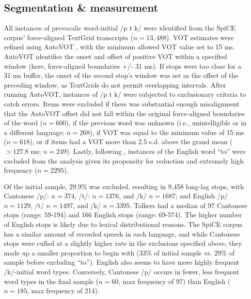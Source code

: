 \subsection{Segmentation \& measurement}
All instances of prevocalic word-initial /p t k/ were identified from the SpiCE corpus' force-aligned TextGrid transcripts ($n=13,488$). VOT estimates were refined using AutoVOT \citep{keshet_2014_autovot}, with the minimum allowed VOT value set to 15 ms. AutoVOT identifies the onset and offset of positive VOT within a specified window (here, force-aligned boundaries +/- 31 ms). If stops were too close for a 31 ms buffer, the onset of the second stop's window was set as the offset of the preceding window, as TextGrids do not permit overlapping intervals. After running AutoVOT, instances of /p t k/ were subjected to exclusionary criteria to catch errors. Items were excluded if there was substantial enough misalignment that the AutoVOT offset did not fall within the original force-aligned boundaries of the word ($n=600$), if the previous word was unknown (i.e., unintelligible or in a different language; $n=268$), if VOT was equal to the minimum value of 15 ms ($n=618$),  or if items had a VOT more than 2.5 s.d. above the grand mean ($>127.8$ ms; $n=249$). Lastly, following \citep{chodroff_2017_structure}, instances of the English word ``to'' were excluded from the analysis given its propensity for reduction and extremely high frequency ($n=2295$). 

Of the initial sample, 29.9\% was excluded, resulting in 9,458 long-lag stops, with Cantonese /p/: $n=374$, /t/: $n=1376$, and /k/ $n=1687$; and English /p/ $n=1129$, /t/ $n=1497$, and /k/ $n=3395$. Talkers had a median of 97 Cantonese stops (range: 59-194) and 166 English stops (range: 69-574). The higher number of English stops is likely due to lexical distributional reasons. The SpiCE corpus has a similar amount of recorded speech in each language, and while Cantonese stops were culled at a slightly higher rate in the exclusions specified above, they made up a smaller proportion to begin with (33\% of initial sample vs. 29\% of sample before excluding ``to''). English also seems to have more highly frequent /k/-initial word types. Conversely, Cantonese /p/ occurs in fewer, less frequent word types in the final sample ($n=60$, max frequency of 97) than English ($n=185$, max frequency of 214).



